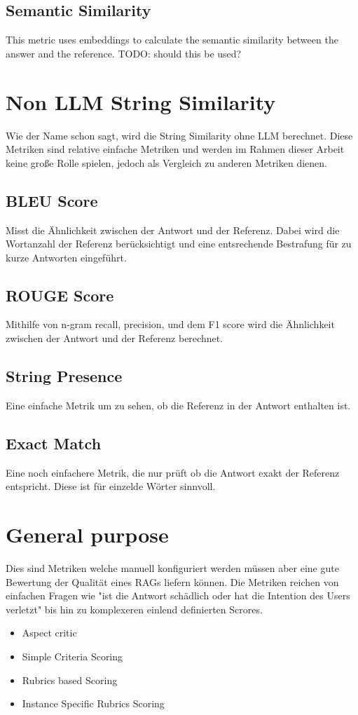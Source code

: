 \subsection{Semantic Similarity}
This metric uses embeddings to calculate the semantic similarity between the answer and the reference. TODO: should this be used?

\section{Non LLM String Similarity}
Wie der Name schon sagt, wird die String Similarity ohne LLM berechnet. Diese Metriken sind relative einfache Metriken und werden im Rahmen dieser Arbeit keine große Rolle spielen, jedoch als Vergleich zu anderen Metriken dienen.
\subsection{BLEU Score}
Misst die Ähnlichkeit zwischen der Antwort und der Referenz. Dabei wird die Wortanzahl der Referenz berücksichtigt und eine entsrechende Bestrafung für zu kurze Antworten eingeführt.
\subsection{ROUGE Score}
Mithilfe von n-gram recall, precision, und dem F1 score wird die Ähnlichkeit zwischen der Antwort und der Referenz berechnet.
\subsection{String Presence}
Eine einfache Metrik um zu sehen, ob die Referenz in der Antwort enthalten ist.
\subsection{Exact Match}
Eine noch einfachere Metrik, die nur prüft ob die Antwort exakt der Referenz entspricht. Diese ist für einzelde Wörter sinnvoll.

\section{General purpose}
Dies sind Metriken welche manuell konfiguriert werden müssen aber eine gute Bewertung der Qualität eines RAGs liefern können.
Die Metriken reichen von einfachen Fragen wie "ist die Antwort schädlich oder hat die Intention des Users verletzt" bis hin zu komplexeren einlend definierten Scrores.
\begin{itemize}
    \item Aspect critic
    \item Simple Criteria Scoring
    \item Rubrics based Scoring
    \item Instance Specific Rubrics Scoring
  \end{itemize}

